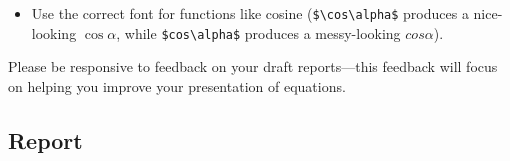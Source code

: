 \documentclass[conf]{new-aiaa}
\begin{document}
\begin{itemize}
\begin{quote}
\begin{lstlisting}[language={[LaTeX]TeX}]
c_{D} &= 2\sin^{2}\alpha
\end{align*}
\end{lstlisting}
\end{quote}
produces the nice-looking result
\begin{align*}
c_{L} &= 2\sin\alpha \cos\alpha \\ 
c_{D} &= 2\sin^{2}\alpha
\end{align*}
while
\begin{quote}
\begin{lstlisting}[language={[LaTeX]TeX}]
\begin{equation*}
c_{L} = 2\sin\alpha \cos\alpha
\end{equation*}
\begin{equation*}
c_{D} = 2\sin^{2}\alpha
\end{equation*}
\end{lstlisting}
\end{quote}
produces the messy-looking result
\begin{equation*}
c_{L} = 2\sin\alpha \cos\alpha
\end{equation*}
\begin{equation*}
c_{D} = 2\sin^{2}\alpha.
\end{equation*}
\item Use the correct font for functions like cosine (\lstinline|$\cos\alpha$| produces a nice-looking $\cos\alpha$, while \lstinline|$cos\alpha$| produces a messy-looking $cos\alpha$).
\end{itemize}
Please be responsive to feedback on your draft reports---this feedback will focus on helping you improve your presentation of equations.

\subsection{Report}
\label{report}
\end{document}
